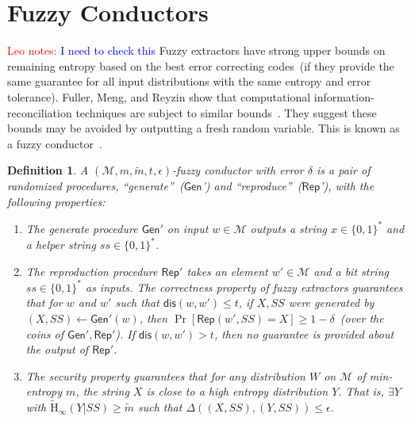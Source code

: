 \documentclass[11pt]{article}
\newcommand{\class}[1]{{\ensuremath{\mathsf{#1}}}}
\newcommand{\gen}{\ensuremath{\class{Gen}}\xspace}
\newcommand{\rep}{\ensuremath{\class{Rep}}\xspace}
\newcommand{\zo}{\ensuremath{\{0, 1\}}}
\newcommand{\dis}{\ensuremath{\mathsf{dis}}}
\newcommand{\Hav}{\tilde{\mathrm{H}}_\infty}
\newtheorem{definition}[theorem]{Definition}
\newcommand{\authnote}[2]{{\textcolor{red}{\textsf{#1 notes: }\textcolor{blue}{ #2}}\marginpar{\textcolor{red}{\textbf{!!!!!}}}}}
\newcommand{\authnote}[2]{}
\newcommand{\lnote}[1]{{\authnote{Leo}{#1}}}
\begin{document}
\section{Fuzzy Conductors}
\lnote{I need to check this}
\label{sec:conductors}
Fuzzy extractors  have strong upper bounds on remaining entropy based on the best error correcting codes~(if they provide the same guarantee for all input distributions with the same entropy and error tolerance).  Fuller, Meng, and Reyzin show that computational information-reconciliation techniques are subject to similar bounds~\cite{fuller2013computational}.  They suggest these bounds may be avoided by outputting a fresh random variable.  This is known as a fuzzy conductor~\cite{KanukurthiR09}.
\begin{definition}
A $(\mathcal{M}, m, \tilde{m}, t, \epsilon)$-\emph{fuzzy conductor} with error $\delta$ is a pair of randomized procedures, ``generate''~(\gen') and ``reproduce''~(\rep'), with the following properties:
\begin{enumerate}
\item The generate procedure $\gen'$ on input $w\in \mathcal{M}$ outputs a string $x\in\zo^*$ and a helper string $ss\in\zo^*$.
\item The reproduction procedure $\rep'$ takes an element $w'\in\mathcal{M}$ and a bit string $ss\in\zo^*$ as inputs.  The \emph{correctness} property of fuzzy extractors guarantees that for $w$ and $w'$ such that $\dis(w, w')\leq t$, if $X, SS$ were generated by $(X, SS)\leftarrow \gen'(w)$, then $\Pr[\rep(w', SS) = X]\geq 1-\delta$~(over the coins of $\gen', \rep'$).  If $\dis(w, w')>t$, then no guarantee is provided about the output of $\rep'$.
\item The security property guarantees that for any distribution $W$ on $\mathcal{M}$ of min-entropy $m$, the string $X$ is close to a high entropy distribution $Y$.  That is, $\exists Y$ with $\Hav(Y | SS ) \geq \tilde{m}$ such that $\Delta((X, SS), (Y, SS))\leq \epsilon$.
\end{enumerate}
\end{definition}
\end{document}
